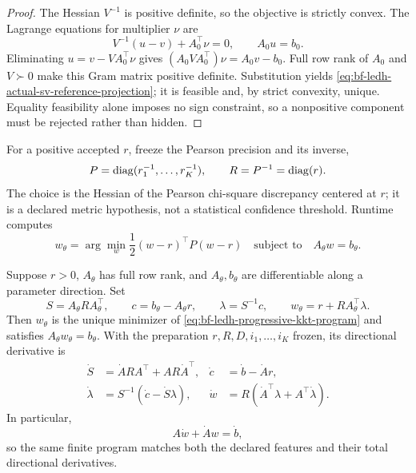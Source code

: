 \begin{proof}
The Hessian \(V^{-1}\) is positive definite, so the objective is strictly
convex.  The Lagrange equations for multiplier \(\nu\) are
\[
  V^{-1}(u-v)+A_0^\top\nu=0,
  \qquad A_0u=b_0.
\]
Eliminating \(u=v-VA_0^\top\nu\) gives
\(
  (A_0VA_0^\top)\nu=A_0v-b_0
\).
Full row rank of \(A_0\) and \(V\succ0\) make this Gram matrix positive
definite.  Substitution yields
\eqref{eq:bf-ledh-actual-sv-reference-projection}; it is feasible and, by
strict convexity, unique.  Equality feasibility alone imposes no sign
constraint, so a nonpositive component must be rejected rather than hidden.
\end{proof}

For a positive accepted \(r\), freeze the Pearson precision and its inverse,
\begin{equation}
\label{eq:bf-ledh-actual-sv-pearson-metric}
  P=\operatorname{diag}(r_1^{-1},\ldots,r_K^{-1}),
  \qquad R=P^{-1}=\operatorname{diag}(r).
\end{equation}
The choice is the Hessian of the Pearson chi-square discrepancy centered at
\(r\); it is a declared metric hypothesis, not a statistical confidence
threshold.  Runtime computes
\begin{equation}
\label{eq:bf-ledh-progressive-kkt-program}
  w_\theta
  =\arg\min_w\frac12(w-r)^\top P(w-r)
  \quad\text{subject to}\quad A_\theta w=b_\theta.
\end{equation}

\begin{proposition}
\label{prop:bf-ledh-progressive-kkt-chart}
Suppose \(r>0\), \(A_\theta\) has full row rank, and \(A_\theta,b_\theta\) are
differentiable along a parameter direction.  Set
\begin{equation}
\label{eq:bf-ledh-progressive-kkt-solution}
  S=A_\theta R A_\theta^\top,\qquad
  c=b_\theta-A_\theta r,\qquad
  \lambda=S^{-1}c,\qquad
  w_\theta=r+RA_\theta^\top\lambda.
\end{equation}
Then \(w_\theta\) is the unique minimizer of
\eqref{eq:bf-ledh-progressive-kkt-program} and satisfies
\(A_\theta w_\theta=b_\theta\).  With the preparation
\(r,R,D,i_1,\ldots,i_K\) frozen, its directional derivative is
\begin{align}
  \dot S&=\dot ARA^\top+AR\dot A^\top,&
  \dot c&=\dot b-\dot A r,
  \label{eq:bf-ledh-actual-sv-kkt-jvp-a}\\
  \dot\lambda&=S^{-1}(\dot c-\dot S\lambda),&
  \dot w&=R(\dot A^\top\lambda+A^\top\dot\lambda).
  \label{eq:bf-ledh-actual-sv-kkt-jvp-b}
\end{align}
In particular,
\begin{equation}
\label{eq:bf-ledh-actual-sv-differentiated-constraint}
  A\dot w+\dot A w=\dot b,
\end{equation}
so the same finite program matches both the declared features and their total
directional derivatives.
\end{proposition}

